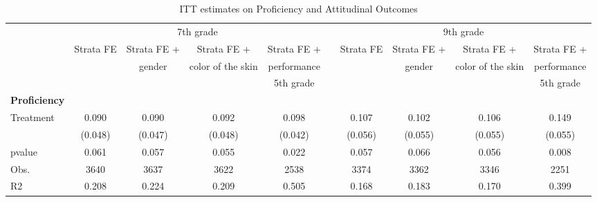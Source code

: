 \documentclass[
	article,			%
	12pt,				%
	oneside,			%
	a4paper,			%
	]{article}
\begin{document}
\begin{landscape}


\begin{table}[ht]
\centering
\begin{threeparttable}
\fontsize{9}{10}\selectfont
\caption{ITT estimates on Proficiency and Attitudinal Outcomes}
\begin{tabular}{lccccccccc}
\hline
\hline
           &                    \multicolumn{ 4}{c}{7th grade} &            &                    \multicolumn{ 4}{c}{9th grade} \\

           & Strata FE  & Strata FE +  & Strata FE +  & Strata FE +  &            & Strata FE  & Strata FE +  & Strata FE +  & Strata FE +  \\

           &            &     gender & color of the skin & performance  &            &            &     gender & color of the skin & performance  \\

           &            &            &            &  5th grade &            &            &            &            &  5th grade \\

{\bf Proficiency} &            &            &            &            &            &            &            &            &            \\

 Treatment &     0.090 &     0.090 &     0.092 &    0.098 &            &     0.107 &     0.102 &     0.106 &   0.149 \\

           &    (0.048) &    (0.047) &    (0.048) &    (0.042) &            &    (0.056) &    (0.055) &    (0.055) &    (0.055) \\

    pvalue &      0.061 &      0.057 &      0.055 &      0.022 &            &      0.057 &      0.066 &      0.056 &      0.008 \\

      Obs. &       3640 &       3637 &       3622 &       2538 &            &       3374 &       3362 &       3346 &       2251 \\

        R2 &      0.208 &      0.224 &      0.209 &      0.505 &            &      0.168 &      0.183 &      0.170 &      0.399 \\


\end{tabular}
\end{threeparttable}
\end{table}
\end{landscape}
\end{document}
